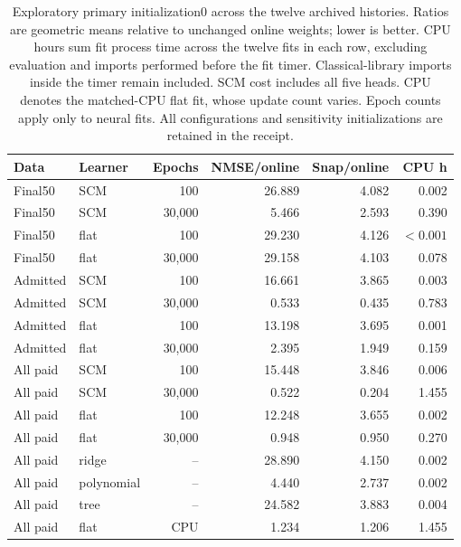\begin{table}[ht]
\centering\small
\begin{tabular}{llrrrr}
\toprule
Data & Learner & Epochs & NMSE/online & Snap/online & CPU h\\
\midrule
Final50 & SCM & 100 & 26.889 & 4.082 & 0.002\\
Final50 & SCM & 30,000 & 5.466 & 2.593 & 0.390\\
Final50 & flat & 100 & 29.230 & 4.126 & $<0.001$\\
Final50 & flat & 30,000 & 29.158 & 4.103 & 0.078\\
Admitted & SCM & 100 & 16.661 & 3.865 & 0.003\\
Admitted & SCM & 30,000 & 0.533 & 0.435 & 0.783\\
Admitted & flat & 100 & 13.198 & 3.695 & 0.001\\
Admitted & flat & 30,000 & 2.395 & 1.949 & 0.159\\
All paid & SCM & 100 & 15.448 & 3.846 & 0.006\\
All paid & SCM & 30,000 & 0.522 & 0.204 & 1.455\\
All paid & flat & 100 & 12.248 & 3.655 & 0.002\\
All paid & flat & 30,000 & 0.948 & 0.950 & 0.270\\
All paid & ridge & -- & 28.890 & 4.150 & 0.002\\
All paid & polynomial & -- & 4.440 & 2.737 & 0.002\\
All paid & tree & -- & 24.582 & 3.883 & 0.004\\
All paid & flat & CPU & 1.234 & 1.206 & 1.455\\
\bottomrule
\end{tabular}
\caption{Exploratory primary initialization0 across the twelve archived histories. Ratios are geometric means relative to unchanged online weights; lower is better. CPU hours sum fit process time across the twelve fits in each row, excluding evaluation and imports performed before the fit timer. Classical-library imports inside the timer remain included. SCM cost includes all five heads. CPU denotes the matched-CPU flat fit, whose update count varies. Epoch counts apply only to neural fits. All configurations and sensitivity initializations are retained in the receipt.}
\label{tab:attribution}
\end{table}

